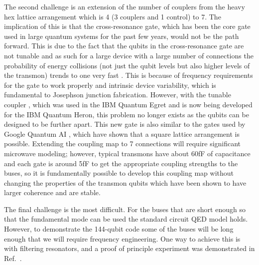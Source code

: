 \documentclass{article}
\begin{document}
The second challenge is an extension of the number of couplers from the heavy hex lattice arrangement \cite{Nation2021} which is 4 (3 couplers and 1 control) to 7. The implication of this is that the cross-resonance gate, which has been the core gate used in large quantum systems for the past few years, would not be the path forward. This is due to the fact that the qubits in the cross-resonance gate are not tunable and as such for a large device with a large number of connections the probability of energy collisions (not just the qubit levels but also higher levels of the transmon) trends to one very fast \cite{Hertzberg2021}. This is because of frequency requirements for the gate to work properly and intrinsic device variability, which is fundamental to Josephson junction fabrication. However, with the tunable coupler \cite{PhysRevApplied.6.064007, PhysRevLett.127.080505}, which was used in the IBM Quantum Egret and is now being developed for the IBM Quantum Heron, this problem no longer exists as the qubits can be designed to be further apart. This new gate is also similar to the gates used by Google Quantum AI \cite{Arute2019}, which have shown that a square lattice arrangement is possible. Extending the coupling map to 7 connections will require significant microwave modeling; however, typical transmons have about 60fF of capacitance and each gate is around 5fF to get the appropriate coupling strengths to the buses, so it is fundamentally possible to develop this coupling map without changing the properties of the transmon qubits which have been shown to have larger coherence and are stable.

The final challenge is the most difficult. For the buses that are short enough so that the fundamental mode can be used the standard circuit QED model holds. However, to demonstrate the 144-qubit code some of the buses will be long enough that we will require frequency engineering. One way to achieve this is with filtering resonators, and a proof of principle experiment was demonstrated in Ref.~\cite{McKay2015}.
\end{document}
